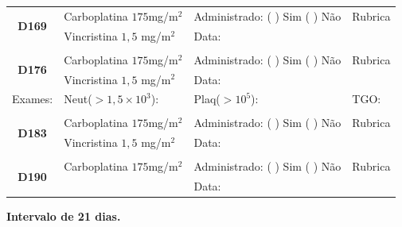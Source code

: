 \documentclass[11pt,a4paper,oldfontcommands]{memoir}
\begin{document}
\begin{center}
\begin{longtable}{p{1cm}p{4cm}|p{5cm}|p{3cm}}
    \hline
    \multicolumn{1}{c|}{\multirow{2}{*}{\textbf{D169}}}&{Carboplatina \(175\)mg/m\(^2\)}&{Administrado: (  ) Sim (  ) Não}&{Rubrica}\\
    \multicolumn{1}{c|}{}&{Vincristina \(1,5\) mg/m\(^2\)}&{Data:}&\\
    \hline
    \\
    \hline
    \multicolumn{1}{c|}{\multirow{2}{*}{\textbf{D176}}}&{Carboplatina \(175\)mg/m\(^2\)}&{Administrado: (  ) Sim (  ) Não}&{Rubrica}\\
    \multicolumn{1}{c|}{}&{Vincristina \(1,5\) mg/m\(^2\)}&{Data:}&\\
    \hline
    \multicolumn{1}{c|}{Exames:}&{Neut(\(>1,5\times10^3\)):}&{Plaq(\(>10^5\)):}&{TGO:}
    \\
    \hline
    \\
    \hline
    \multicolumn{1}{c|}{\multirow{2}{*}{\textbf{D183}}}&{Carboplatina \(175\)mg/m\(^2\)}&{Administrado: (  ) Sim (  ) Não}&{Rubrica}\\
    \multicolumn{1}{c|}{}&{Vincristina \(1,5\) mg/m\(^2\)}&{Data:}&\\
    \hline
    \\
    \hline
    \multicolumn{1}{c|}{\multirow{2}{*}{\textbf{D190}}}&{Carboplatina \(175\)mg/m\(^2\)}&{Administrado: (  ) Sim (  ) Não}&{Rubrica}\\
	\multicolumn{1}{c|}{}&&{Data:}&\\
    \hline
\end{longtable}
\textbf{Intervalo de 21 dias.}
\end{center}
\end{document}

